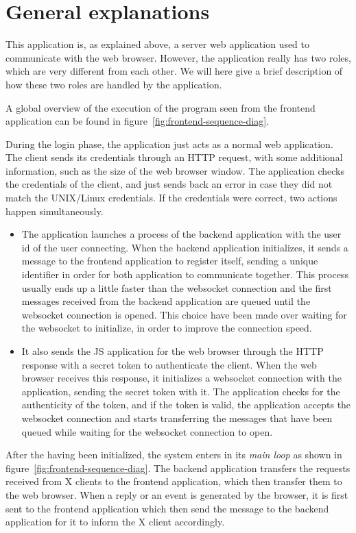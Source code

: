 \section{General explanations}
% 
This application is, as explained above, a server web application used to 
communicate with the web browser. However, the application really has two 
roles, which are very different from each other. We will here give a brief 
description of how these two roles are handled by the application.

A global overview of the execution of the program seen from the frontend 
application can be found in figure~\ref{fig:frontend-sequence-diag}.


During the login phase, the application just acts as a normal web 
application. The client sends its credentials through an HTTP request,
with some additional information, such as the size of the web browser 
window. The application checks the credentials of the client, and 
just sends back an error in case they did not match the UNIX/Linux 
credentials. If the credentials were correct, two actions happen 
simultaneously. 
\begin{itemize}
\item The application launches a process of the backend 
  application with the user id of the user connecting.
%  
  When the backend application initializes, it sends a message to 
  the frontend application to register itself, sending a unique identifier 
  in order for both application to communicate together. 
%
  This process usually ends up a little faster than the websocket connection and 
  the first messages received from the backend application are queued until 
  the websocket connection is opened. This choice have been made over waiting 
  for the websocket to initialize, in order to improve the connection speed.
\item It also sends the JS application for the web browser through the HTTP 
  response with a secret token to authenticate the client. 
%  
  When the web browser receives this response, it initializes a websocket 
  connection with the application, sending the secret token with it. 
%
  The application checks for the authenticity of the token, and if the token is valid, 
  the application accepts the websocket connection and starts transferring the messages 
  that have been queued while waiting for the websocket connection to open.
\end{itemize}

After the having been initialized, the system enters in its \emph{main loop} as shown 
in figure~\ref{fig:frontend-sequence-diag}. The backend application transfers the 
requests received from X clients to the frontend application, which then transfer 
them to the web browser. When a reply or an event is generated by the browser, 
it is first sent to the frontend application which then send the message to the backend 
application for it to inform the X client accordingly.
